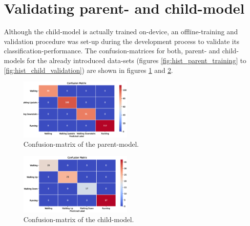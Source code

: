 \documentclass[journal]{IEEEtran}
\begin{document}
\section{Validating parent- and child-model}
Although the child-model is actually trained on-device, an offline-training and
validation procedure was set-up during the development process to validate its 
classification-performance. The
confusion-matrices for both, parent- and child-models for the already introduced
data-sets (figures \ref{fig:hist_parent_training} to \ref{fig:hist_child_validation}) 
are shown in figures \ref{fig:parent_confusion_matrix} and
\ref{fig:child_confusion_matrix}.

\begin{figure}
    \centering
    \includegraphics[width=0.5\textwidth]{figures/parent_confusion_matrix.eps}
    \caption{Confusion-matrix of the parent-model.}
    \label{fig:parent_confusion_matrix}
\end{figure}


\begin{figure}
    \centering
    \includegraphics[width=0.5\textwidth]{figures/child_confusion_matrix.eps}
    \caption{Confusion-matrix of the child-model.}
    \label{fig:child_confusion_matrix}
\end{figure}
\end{document}

